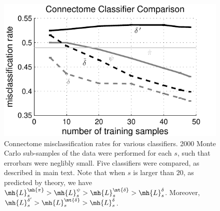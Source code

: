 \documentclass[10pt,journal,cspaper,compsoc]{IEEEtran}
\begin{document}
\begin{figure}[htbp]
	\centering
		\includegraphics[width=1.0\linewidth]{../figs/Lhat_vs_s_binary.pdf}
		\caption{Connectome misclassification rates for various classifiers.  2000 Monte Carlo sub-samples of the data were performed for each $s$, such that errorbars were neglibly small.  Five classifiers were compared, as described in main text.  Note that when $s$ is larger than $20$, as predicted by theory, we have $\mh{L}^{\mh{\pi}}_s > \mh{L}^\psi_s > \mh{L}^{\mt{\delta}}_s > \mh{L}_s^\delta$. Moreover, $\mh{L}^{\delta'}_s > \mh{L}^{\mt{\delta}}_s > \mh{L}_s^\delta$.}
	\label{fig:1}
\end{figure}

\end{document}
